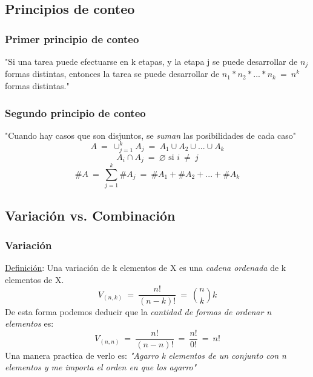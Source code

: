 \documentclass{article}
\newcommand{\eq}{\:=\:}                                 %
\newcommand{\neqs}{\:\neq\:}                            %
\begin{document}
\subsection{Principios de conteo}
\subsubsection*{Primer principio de conteo}
"Si una tarea puede efectuarse en k etapas, y la etapa j se puede desarrollar de $n_j$ formas distintas, entonces 
la tarea se puede desarrollar de $n_1 * n_2 * ... * n_k \eq n^k$ formas distintas."
\subsubsection*{Segundo principio de conteo}
"Cuando hay casos que son disjuntos, se \emph{suman} las posibilidades de cada caso"
\begin{equation*}
    A \eq \cup^k _{j=1} A_j \eq A_1 \cup A_2 \cup ... \cup A_k
\end{equation*}
\begin{equation*}
    A_i \cap A_j \eq \varnothing \text{ si } i \neqs j
\end{equation*}
\begin{equation*}
    \# A \eq \sum^k _{j=1} \# A_j \eq \# A_1 + \# A_2 + ... + \# A_k
\end{equation*}

\subsection{Variación vs. Combinación}
\subsubsection*{Variación}
\underline{Definición}: Una variación de k elementos de X es una \emph{cadena ordenada} de k elementos de X.
\begin{equation*}
    V_{(n,k)} \eq \frac{n!}{(n-k)!} \eq \binom{n}{k}k
\end{equation*}
De esta forma podemos deducir que la \emph{cantidad de formas de ordenar n elementos} es:
\begin{equation*}
    V_{(n,n)} \eq \frac{n!}{(n-n)!} \eq \frac{n!}{0!} \eq n!
\end{equation*}
Una manera practica de verlo es: \emph{"Agarro k elementos de un conjunto con n elementos y me importa el orden en que los agarro"}
\end{document}

